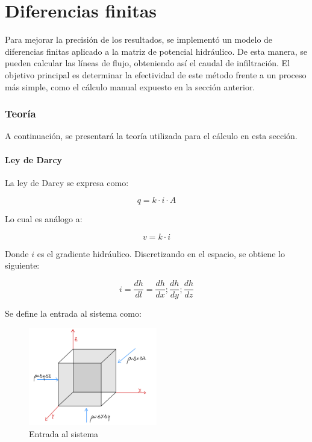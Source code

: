 \part{Diferencias finitas}

Para mejorar la precisión de los resultados, se implementó un modelo de diferencias finitas aplicado a la matriz de potencial hidráulico. De esta manera, se pueden calcular las líneas de flujo, obteniendo así el caudal de infiltración. El objetivo principal es determinar la efectividad de este método frente a un proceso más simple, como el cálculo manual expuesto en la sección anterior.

\section{Teoría}

A continuación, se presentará la teoría utilizada para el cálculo en esta sección.

\subsection{Ley de Darcy}

La ley de Darcy se expresa como:

\begin{equation}
    q = k \cdot i \cdot A
\end{equation}

Lo cual es análogo a:

\begin{equation}
    v = k \cdot i
\end{equation}

Donde \(i\) es el gradiente hidráulico. Discretizando en el espacio, se obtiene lo siguiente:

\begin{equation}
    i = \frac{dh}{dl} = \frac{dh}{dx}; \frac{dh}{dy}; \frac{dh}{dz}
\end{equation}

Se define la entrada al sistema como:

\begin{figure}[H]
    \centering
    \includegraphics[width=0.5\textwidth]{FOTOS/in.jpg}
    \caption{Entrada al sistema}
    \label{fig:ley_darcy_in}
\end{figure}

